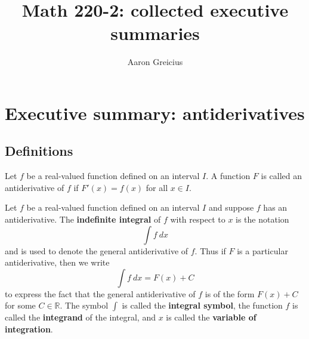 
\title{Math 220-2: collected executive summaries}
\author{Aaron Greicius}

\maketitle
\tableofcontents\newpage

\section{Executive summary: antiderivatives}

\thispagestyle{fancy}
\subsection*{Definitions}
\begin{namedtheorem}[Antiderivative] Let $f$ be a real-valued function defined on an interval $I$. A function $F$ is called an antiderivative of $f$ if $F'(x)=f(x)$ for all $x\in I$.
\end{namedtheorem}

\begin{namedtheorem} Let $f$ be a real-valued function defined on an interval $I$ and suppose $f$ has an antiderivative. The {\bf indefinite integral} of $f$ with respect to $x$ is the notation
  \[
  \int f \ dx
  \]
and is used to denote the general antiderivative of $f$. Thus if $F$ is a particular antiderivative, then we write
\[
\int f \ dx=F(x)+C
\]
to express the fact that the general antiderivative of $f$ is of the form $F(x)+C$ for some $C\in \mathbb{R}$. The symbol $\int$ is called the {\bf integral symbol}, the function $f$ is called the {\bf integrand} of the integral, and $x$ is called the {\bf variable of integration}.
\end{namedtheorem}
